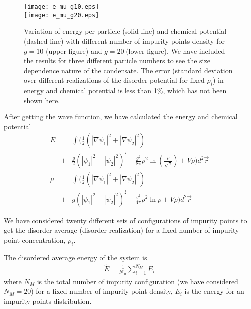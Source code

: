 \documentclass[amsmath,amssymb,lengthcheck,aps,prl] {revtex4}
\begin{document}
\begin{figure}
  \begin{center}
	   \texttt{[image: e\_mu\_g10.eps]}\\
	    \texttt{[image: e\_mu\_g20.eps]}
\caption{ Variation of energy per particle (solid line) and chemical potential (dashed line) with different number of impurity points density for $g = 10$ (upper figure) and $g = 20$ (lower figure). We have included the results for three different particle numbers to see the size dependence nature of the condensate. The error (standard deviation over different realizations of the disorder potential for fixed $\rho_i$) in energy and chemical potential is less than 1\%, which has not been shown here.}
    \label{fig:2Denergy}
  \end{center}
\end{figure}


 After getting the wave function, we have calculated the energy and chemical potential
\begin{eqnarray}
E &=& \int \Big ( \frac{1}{2} \left(|\nabla\psi_1|^2+|\nabla\psi_2|^2 \right) \\
&+& \frac{g}{2} \left( |\psi_1|^2-|\psi_2|^2 \right)^2+ \frac{g^2} {8\pi} \rho^2 \ln (\frac{\rho}{{\sqrt e}}) + V\rho \Big )d^2\vec{r} \nonumber \\
\mu &=& \int \Big ( \frac{1}{2} \left(|\nabla\psi_1|^2+|\nabla\psi_2|^2 \right) \\
&+& g \left( |\psi_1|^2-|\psi_2|^2 \right)^2+ \frac{g^2} {4\pi} \rho^2 \ln \rho + V\rho \Big )d^2\vec{r} \nonumber 
\end{eqnarray}
  
 We have considered twenty different sets of configurations of impurity points to get the disorder average (disorder realization) for a fixed number of impurity point concentration, $\rho_i$.

The disordered average energy of the system is
\begin{eqnarray}
	\tilde{E} = \frac{1}{N_M}\sum^{N_M}_{i=1}   E_i
\end{eqnarray}
where $N_M$ is the total number of impurity configuration (we have considered $N_M=20$) for a fixed number of impurity point density, $E_i$ is the energy for an impurity points distribution.  

\end{document}
